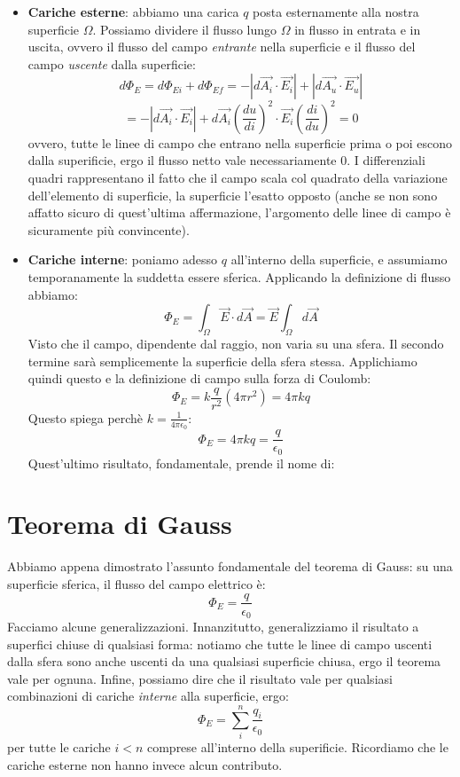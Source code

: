 \documentclass[a4paper,12pt]{article}
\begin{document}
\begin{itemize}
  \item \textbf{Cariche esterne}: abbiamo una carica $q$ posta esternamente alla nostra superficie $\Omega$. Possiamo dividere il flusso lungo $\Omega$ in flusso in entrata e in uscita, ovvero il flusso del campo \textit{entrante} nella superficie
    e il flusso del campo \textit{uscente} dalla superficie:
    $$ d\Phi_E = d\Phi_{Ei} + d\Phi_{Ef} = -|d\vec{A_i} \cdot \vec{E_i}| + |d\vec{A_u} \cdot \vec{E_u}| $$
    $$ = -|d\vec{A_i} \cdot \vec{E_i}| + d\vec{A_i}\left(\frac{du}{di}\right)^2 \cdot \vec{E_i}\left(\frac{di}{du}\right)^2 = 0 $$
    ovvero, tutte le linee di campo che entrano nella superficie prima o poi escono dalla superificie, ergo il flusso netto vale necessariamente 0. I differenziali quadri rappresentano il fatto che il campo scala col quadrato della variazione dell'elemento di superficie,
    la superficie l'esatto opposto (anche se non sono affatto sicuro di quest'ultima affermazione, l'argomento delle linee di campo è sicuramente più convincente).
  \item \textbf{Cariche interne}: poniamo adesso $q$ all'interno della superficie, e assumiamo temporanamente la suddetta essere sferica. Applicando la definizione di flusso abbiamo:
    $$ \Phi_E = \int_\Omega \vec{E} \cdot d\vec{A} = \vec{E} \int_\Omega d\vec{A} $$
    Visto che il campo, dipendente dal raggio, non varia su una sfera. Il secondo termine sarà semplicemente la superficie della sfera stessa. Applichiamo quindi questo e la definizione di campo sulla forza di Coulomb:
    $$ \Phi_E = k \frac{q}{r^2} (4\pi r^2) = 4\pi kq $$
    Questo spiega perchè $ k = \frac{1}{4\pi \epsilon_0}$:
    $$ \Phi_E = 4\pi kq = \frac{q}{\epsilon_0}$$
    Quest'ultimo risultato, fondamentale, prende il nome di:
\end{itemize}
\section{Teorema di Gauss}
Abbiamo appena dimostrato l'assunto fondamentale del teorema di Gauss: su una superficie sferica, il flusso del campo elettrico è:
$$ \Phi_E = \frac{q}{\epsilon_0}$$
Facciamo alcune generalizzazioni. Innanzitutto, generalizziamo il risultato a superfici chiuse di qualsiasi forma: notiamo che tutte le linee di campo uscenti dalla sfera sono anche uscenti da una qualsiasi superficie chiusa, ergo il teorema vale per
ognuna. Infine, possiamo dire che il risultato vale per qualsiasi combinazioni di cariche \textit{interne} alla superficie, ergo:
$$ \Phi_E = \sum_i^n \frac{q_i}{\epsilon_0} $$
per tutte le cariche $i < n$ comprese all'interno della superificie. Ricordiamo che le cariche esterne non hanno invece alcun contributo.
\end{document}
